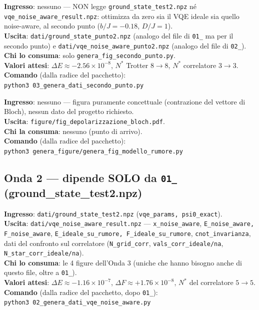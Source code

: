 \documentclass[11pt,a4paper]{article}
\newcommand{\code}[1]{\texttt{\small #1}}
\begin{document}
\begin{keyeq}[title={03\_genera\_dati\_secondo\_punto.py}]
\textbf{Ingresso}: nessuno --- NON legge \code{ground\_state\_test2.npz}
né \code{vqe\_noise\_aware\_result.npz}: ottimizza da zero sia il VQE
ideale sia quello noise-aware, al secondo punto ($b/J=-0.18$, $D/J=1$).\\
\textbf{Uscita}: \code{dati/ground\_state\_punto2.npz} (analogo del file
di \code{01\_} ma per il secondo punto) e
\code{dati/vqe\_noise\_aware\_punto2.npz} (analogo del file di \code{02\_}).\\
\textbf{Chi lo consuma}: solo \code{genera\_fig\_secondo\_punto.py}.\\
\textbf{Valori attesi}: $\Delta E\approx-2.56\times10^{-8}$,
$N^*$ Trotter $8\to8$, $N^*$ correlatore $3\to3$.\\
\textbf{Comando} (dalla radice del pacchetto):\\
\code{python3 03\_genera\_dati\_secondo\_punto.py}
\end{keyeq}

\begin{keyeq}[title={genera\_fig\_modello\_rumore.py}]
\textbf{Ingresso}: nessuno --- figura puramente concettuale (contrazione
del vettore di Bloch), nessun dato del progetto richiesto.\\
\textbf{Uscita}: \code{figure/fig\_depolarizzazione\_bloch.pdf}.\\
\textbf{Chi la consuma}: nessuno (punto di arrivo).\\
\textbf{Comando} (dalla radice del pacchetto):\\
\code{python3 genera\_figure/genera\_fig\_modello\_rumore.py}
\end{keyeq}

\subsection{Onda 2 --- dipende SOLO da \texorpdfstring{\code{01\_}}{01\_} (ground\_state\_test2.npz)}

\begin{keyeq}[title={02\_genera\_dati\_vqe\_noise\_aware.py}]
\textbf{Ingresso}: \code{dati/ground\_state\_test2.npz} (\code{vqe\_params, psi0\_exact}).\\
\textbf{Uscita}: \code{dati/vqe\_noise\_aware\_result.npz} ---
\code{x\_noise\_aware}, \code{E\_noise\_aware, F\_noise\_aware},
\code{E\_ideale\_su\_rumore, F\_ideale\_su\_rumore}, \code{cnot\_invarianza},
dati del confronto sul correlatore (\code{N\_grid\_corr},
\code{vals\_corr\_ideale/na}, \code{N\_star\_corr\_ideale/na}).\\
\textbf{Chi lo consuma}: le 4 figure dell'Onda 3 (uniche che hanno
bisogno anche di questo file, oltre a \code{01\_}).\\
\textbf{Valori attesi}: $\Delta E\approx-1.16\times10^{-7}$,
$\Delta F\approx+1.76\times10^{-8}$, $N^*$ del correlatore $5\to5$.\\
\textbf{Comando} (dalla radice del pacchetto, dopo \code{01\_}):\\
\code{python3 02\_genera\_dati\_vqe\_noise\_aware.py}
\end{keyeq}
\end{document}
